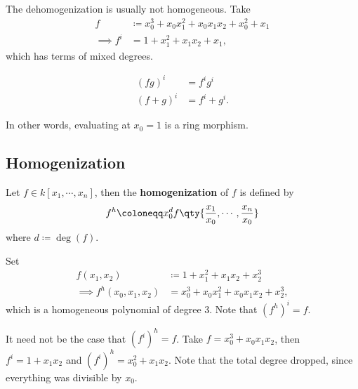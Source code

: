 \begin{example}

The dehomogenization is usually not homogeneous. Take
\begin{align*}  
f &\coloneqq x_0^3 + x_0 x_1^2 + x_0 x_1 x_2 + x_0^2 + x_1 \\
\implies f^i &= 1  +x_1^2 + x_1 x_2 + x_1
,\end{align*}
which has terms of mixed degrees.

\end{example}

\begin{remark}

\begin{align*}  
(fg)^i &= f^i g^i \\
(f+g)^i &= f^i + g^i
.\end{align*}

In other words, evaluating at \(x_0 = 1\) is a ring morphism.

\end{remark}

\hypertarget{homogenization}{%
\subsection{Homogenization}\label{homogenization}}

\begin{definition}

Let \(f\in k[x_1, \cdots, x_{n}]\), then the \textbf{homogenization} of
\(f\) is defined by
\begin{align*}  
f^h \coloneqq x_0^d f\qty{ {x_1 \over x_0}, \cdots, {x_n \over x_0} }
\end{align*}
where \(d\coloneqq\deg(f)\).

\end{definition}

\begin{example}[?]

Set
\begin{align*}  
f(x_1, x_2) &\coloneqq 1 + x_1^2 + x_1 x_2 + x_2^3 \\
\implies f^h(x_0, x_1, x_2) &= x_0^3 + x_0 x_1^2 + x_0 x_1 x_2 + x_2^3
,\end{align*}
which is a homogeneous polynomial of degree \(3\). Note that
\((f^h)^i = f\).

\end{example}

\begin{example}[?]

It need not be the case that \((f^i)^h = f\). Take
\(f = x_0^3 + x_0 x_1 x_2\), then \(f^i = 1 + x_1 x_2\) and
\((f^i)^h = x_0^2 + x_1 x_2\). Note that the total degree dropped, since
everything was divisible by \(x_0\).

\end{example}

